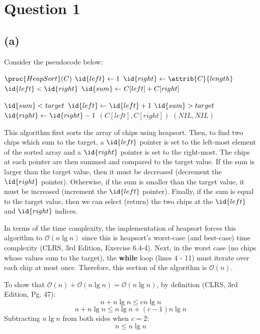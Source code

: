 \section{Question 1}
    \subsection{(a)}
    Consider the pseudocode below:
    \begin{codebox}
        \li $\proc{HeapSort}(C)$
        \li $\id{left} \gets 1$
        \li $\id{right} \gets \attrib{C}{length}$
        \li \While $\id{left} < \id{right}$
            \Do
                \li $\id{sum} \gets C[left] + C[right]$

                \li \If $\id{sum} < target$
                \Then
                    \li $\id{left} \gets \id{left} + 1$
                \li \ElseIf $\id{sum} > target$
                \Then
                    \li $\id{right} \gets \id{right} - 1$
                \li \ElseNoIf
                    \li \Return $(C[left], C[right])$
                \End 
            \End
        \li \Return $(NIL, NIL)$
    \end{codebox}

    This algorithm first sorts the array of chips using heapsort. 
    Then, to find two chips which sum to the target, a $\id{left}$ pointer is set to the left-most element of the sorted array and a $\id{right}$ pointer is set to the right-most.
    The chips at each pointer are then summed and compared to the target value.
    If the sum is larger than the target value, then it must be decreased (decrement the $\id{right}$ pointer).
    Otherwise, if the sum is smaller than the target value, it must be increased (increment the $\id{left}$ pointer).
    Finally, if the sum is equal to the target value, then we can select (return) the two chips at the $\id{left}$ and $\id{right}$ indices.

    In terms of the time complexity, the implementation of heapsort forces this algorithm to $\mathcal{O}(n\lg{n})$ since this is heapsort's worst-case (and best-case) time complexity (CLRS, 3rd Edition, Exercise 6.4-4).
    Next, in the worst case (no chips whose values sum to the target), the \textbf{while} loop (lines 4 - 11) must iterate over each chip at most once.
    Therefore, this section of the algorithm is $\mathcal{O}(n)$.

    To show that $\mathcal{O}(n) + \mathcal{O}(n\lg{n}) = \mathcal{O}(n\lg{n})$, by definition (CLRS, 3rd Edition, Pg. 47):
    \[n + n\lg{n} \le cn\lg{n}\]
    \[n + n\lg{n} \le n\lg{n} + (c-1)n\lg{n}\]
    Subtracting $n\lg{n}$ from both sides when $c = 2$:
    \[n \le n\lg{n}\]

